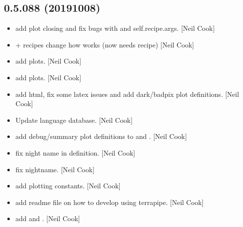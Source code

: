 \documentclass[a4paper,10pt,english]{report}
\begin{document}
\subsection{0.5.088 (2019\sphinxhyphen{}10\sphinxhyphen{}08)}
\label{\detokenize{misc/changelog:id74}}\begin{itemize}
\item {} 
 \sphinxhyphen{} add plot closing and fix bugs
with  and self.recipe.args. {[}Neil Cook{]}

\item {} 
 +  recipes \sphinxhyphen{} change how  works
(now needs recipe) {[}Neil Cook{]}

\item {} 
 \sphinxhyphen{} add plots. {[}Neil Cook{]}

\item {} 
 \sphinxhyphen{} add plots. {[}Neil Cook{]}

\item {} 
 \sphinxhyphen{} add html, fix some latex issues and add dark/badpix
plot definitions. {[}Neil Cook{]}

\item {} 
Update language database. {[}Neil Cook{]}

\item {} 
 \sphinxhyphen{} add debug/summary plot
definitions to  and . {[}Neil Cook{]}

\item {} 
 \sphinxhyphen{} fix night name in
 definition. {[}Neil Cook{]}

\item {} 
 \sphinxhyphen{} fix nightname. {[}Neil Cook{]}

\item {} 
 \sphinxhyphen{} add plotting constants. {[}Neil Cook{]}

\item {} 
 \sphinxhyphen{} add readme file on how to develop using
terrapipe. {[}Neil Cook{]}

\item {} 
 add  and .
{[}Neil Cook{]}

\end{itemize}
\end{document}
